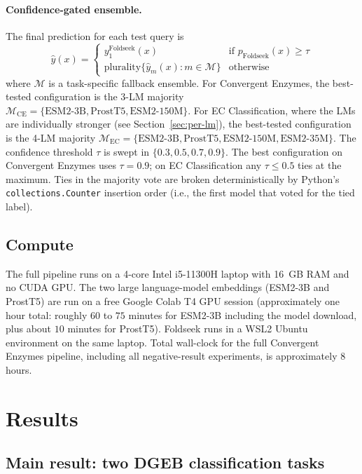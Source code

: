 \documentclass[11pt,letterpaper]{article}
\begin{document}
\paragraph{Confidence-gated ensemble.}
The final prediction for each test query is
\begin{equation}
\hat{y}(x) = \begin{cases}
y^{\text{Foldseek}}_{1}(x) & \text{if } p_{\text{Foldseek}}(x) \geq \tau \\
\text{plurality}\bigl\{\hat{y}_{m}(x) : m \in \mathcal{M}\bigr\} & \text{otherwise}
\end{cases}
\end{equation}
where $\mathcal{M}$ is a task-specific fallback ensemble. For
Convergent Enzymes, the best-tested configuration is the 3-LM
majority $\mathcal{M}_{\text{CE}} = \{\text{ESM2-3B}, \text{ProstT5},
\text{ESM2-150M}\}$. For EC Classification, where the LMs are
individually stronger (see Section~\ref{sec:per-lm}), the best-tested
configuration is the 4-LM majority
$\mathcal{M}_{\text{EC}} = \{\text{ESM2-3B}, \text{ProstT5},
\text{ESM2-150M}, \text{ESM2-35M}\}$. The confidence threshold $\tau$
is swept in $\{0.3, 0.5, 0.7, 0.9\}$. The best configuration on
Convergent Enzymes uses $\tau = 0.9$; on EC Classification any
$\tau \leq 0.5$ ties at the maximum. Ties in the majority vote are
broken deterministically by Python's \texttt{collections.Counter}
insertion order (i.e., the first model that voted for the tied label).

\subsection{Compute}

The full pipeline runs on a 4-core Intel i5-11300H laptop with 16~GB RAM
and no CUDA GPU. The two large language-model embeddings (ESM2-3B and
ProstT5) are run on a free Google Colab T4 GPU session (approximately
one hour total: roughly $60$ to $75$ minutes for ESM2-3B including the
model download, plus about $10$ minutes for ProstT5). Foldseek runs in
a WSL2 Ubuntu environment on the same laptop. Total wall-clock for the
full Convergent Enzymes pipeline, including all negative-result
experiments, is approximately 8 hours.

\section{Results}

\subsection{Main result: two DGEB classification tasks}
\label{sec:results-main}
\end{document}
